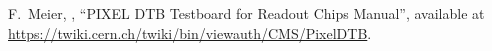  F.~Meier, \etal, ``PIXEL DTB Testboard for Readout Chips Manual'',
  available at \url{https://twiki.cern.ch/twiki/bin/viewauth/CMS/PixelDTB}.